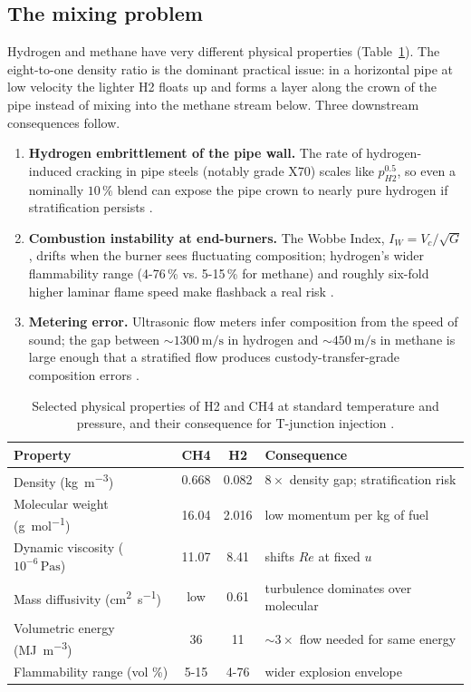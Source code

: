 \documentclass[11pt,a4paper]{article}
\def\Hi{H2}%
\def\CHi{CH4}%
\newcommand{\Hi}{\ensuremath{\mathrm{H_2}}}
\newcommand{\CHi}{\ensuremath{\mathrm{CH_4}}}
\begin{document}
\subsection{The mixing problem}
\label{sec:intro_mixing}
Hydrogen and methane have very different physical properties
(Table~\ref{tab:properties}). The eight-to-one density ratio is the
dominant practical issue: in a horizontal pipe at low velocity the
lighter \Hi{} floats up and forms a layer along the crown of the
pipe instead of mixing into the methane stream below. Three
downstream consequences follow.
\begin{enumerate}
    \item \textbf{Hydrogen embrittlement of the pipe wall.}\;
    The rate of hydrogen-induced cracking in pipe steels (notably
    grade X70) scales like \(p_{\Hi}^{0.5}\), so even a nominally
    \(10\,\%\) blend can expose the pipe crown to nearly pure
    hydrogen if stratification persists \citep{topolski2022blending}.
    \item \textbf{Combustion instability at end-burners.}\;
    The Wobbe Index, \(I_W = V_c/\sqrt{G}\), drifts when the burner
    sees fluctuating composition; hydrogen's wider flammability range
    (4-76\,\% vs. 5-15\,\% for methane) and roughly six-fold higher
    laminar flame speed make flashback a real risk
    \citep{topolski2022blending}.
    \item \textbf{Metering error.}\;
    Ultrasonic flow meters infer composition from the speed of sound;
    the gap between \(\sim\SI{1300}{\meter\per\second}\) in hydrogen
    and \(\sim\SI{450}{\meter\per\second}\) in methane is large
    enough that a stratified flow produces custody-transfer-grade
    composition errors \citep{su2022prediction}.
\end{enumerate}

\begin{table}[H]
\centering
\small
\caption{Selected physical properties of \Hi{} and \CHi{} at standard
temperature and pressure, and their consequence for T-junction
injection \citep{su2022prediction,montanes2024comprehensive}.}
\label{tab:properties}
\begin{tabular}{lccl}
\toprule
\textbf{Property} & \textbf{\CHi{}} & \textbf{\Hi{}} & \textbf{Consequence} \\
\midrule
Density (\si{\kg\per\cubic\metre})       & 0.668 & 0.082 & \(8\times\) density gap; stratification risk \\
Molecular weight (\si{\g\per\mol})        & 16.04 & 2.016 & low momentum per kg of fuel \\
Dynamic viscosity (\(10^{-6}\,\si{\pascal\second}\)) & 11.07 & 8.41 & shifts \(Re\) at fixed \(u\) \\
Mass diffusivity (\si{\square\centi\metre\per\second}) & low & 0.61 & turbulence dominates over molecular \\
Volumetric energy (\si{\mega\joule\per\cubic\metre}) & 36 & 11 & \(\sim\!3\times\) flow needed for same energy \\
Flammability range (vol \%)               & 5-15 & 4-76 & wider explosion envelope \\
\bottomrule
\end{tabular}
\end{table}
\end{document}
